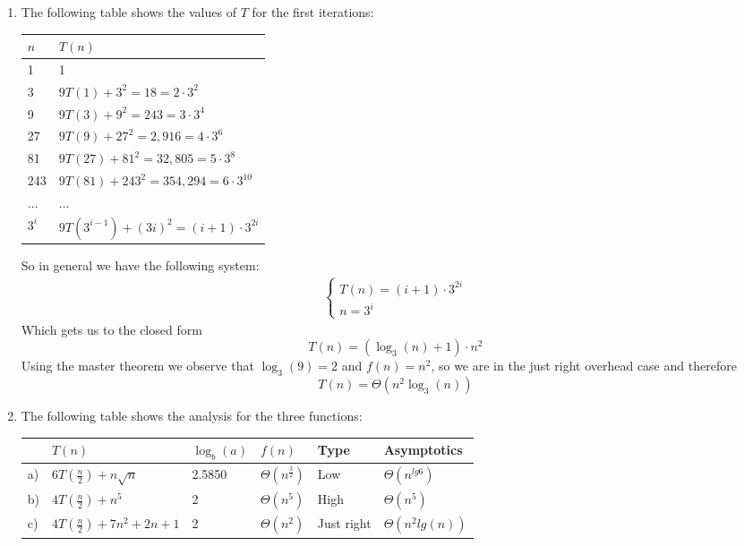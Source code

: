 \documentclass{article}
\begin{document}
\begin{enumerate}[1.]

    \item The following table shows the values of $T$ for the first iterations:
    	\begin{table}[h!t]
		\centering
		\begin{tabular}{ll}
			\toprule
			$n$ & $T(n)$\\
			\midrule
            1 & 1\\
            3 & $9T(1)+3^2=18=2\cdot3^2$\\
            9 & $9T(3)+9^2=243=3\cdot3^4$\\
            27 & $9T(9)+27^2=2,916=4\cdot3^6$\\
            81 & $9T(27)+81^2=32,805=5\cdot3^8$\\
            243 & $9T(81)+243^2=354,294=6\cdot3^{10}$\\
            $\ldots$ & $\ldots$\\
            $3^i$ & $9T(3^{i-1})+(3i)^2=(i+1)\cdot3^{2i}$\\
			\bottomrule
		\end{tabular}
	    \end{table}
	
	So in general we have the following system:
	\begin{gather*}
      \left\{
        \begin{array}{l}
    	    T(n) = (i+1)\cdot3^{2i}\\
    	    n = 3^i
        \end{array}
      \right.
    \end{gather*}
    Which gets us to the closed form
    \begin{equation*}
        T(n) = (\log_3(n)+1)\cdot n^2
    \end{equation*}
    Using the master theorem we observe that $\log_3(9)=2$ and $f(n)=n^2$, so we are in the just right overhead case and therefore
    \begin{equation*}
        T(n)=\Theta(n^2\log_3(n))
    \end{equation*}
    
    \item The following table shows the analysis for the three functions:
	\begin{table}[h!t]
		\centering
		\begin{tabular}{llllll}
			\toprule
			& $T(n)$ & $\log_b(a)$ & $f(n)$ & Type & Asymptotics\\
			\midrule
			a) & $6T(\frac{n}{2}) + n\sqrt{n}$ & 2.5850 & $\Theta(n^\frac{3}{2})$ & Low & $\Theta(n^{\textit{lg}6})$\\
			b) & $4T(\frac{n}{2}) + n^5$ & 2 & $\Theta(n^5)$ & High & $\Theta(n^5)$\\
			c) & $4T(\frac{n}{2}) + 7n^2 + 2n + 1$ & 2 & $\Theta(n^2)$ & Just right & $\Theta(n^2 \textit{lg}(n))$\\
			\bottomrule
		\end{tabular}
    \end{table}
    

\end{enumerate}
\end{document}
